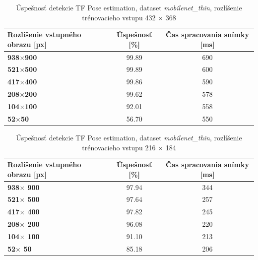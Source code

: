 \documentclass[slovak,master,dept460,male,cpp,cpdeclaration]{diploma}
\begin{document}
\begin{table}[H]
\begin{tabular}{|l|c|c|}
\hline
\textbf{Rozlíšenie vstupného obrazu [px]}        & \textbf{Úspešnosť [\%]}  & \textbf{Čas spracovania snímky [ms]} \\ \hline
\textbf{938$\times$900}      & 99.89     & 690        \\ \hline
\textbf{521$\times$500}      & 99.89     & 600     \\ \hline
\textbf{417$\times$400}      & 99.86     &  590    \\ \hline
\textbf{208$\times$200}      & 99.62     &  578    \\ \hline
\textbf{104$\times$100}      & 92.01     &  558    \\ \hline
\textbf{52$\times$50}       &  56.70     & 550     \\ \hline
\end{tabular}

	\caption{Úspešnosť detekcie TF Pose estimation, dataset \textit{mobilenet\_thin}, rozlíšenie trénovacieho vstupu 432 $\times$ 368}
	\label{tab:tf1}
\end{table}


\begin{table}[H]
\begin{tabular}{|l|c|c|}
\hline
\textbf{Rozlíšenie vstupného obrazu [px]}        & \textbf{Úspešnosť [\%]}  & \textbf{Čas spracovania snímky [ms]} \\ \hline
\textbf{938$\times$ 900}      & 97.94     & 344     \\ \hline
\textbf{521$\times$ 500}      & 97.64     & 257     \\ \hline
\textbf{417$\times$ 400}      & 97.82     & 245     \\ \hline
\textbf{208$\times$ 200}      & 96.08     & 220     \\ \hline
\textbf{104$\times$ 100}      & 91.10     & 213     \\ \hline
\textbf{52$\times$  50}       & 85.18     & 206     \\ \hline
\end{tabular}

	\caption{Úspešnosť detekcie TF Pose estimation, dataset \textit{mobilenet\_thin}, rozlíšenie trénovacieho vstupu 216 $\times$ 184}
	\label{tab:tf2}
\end{table}
\end{document}
